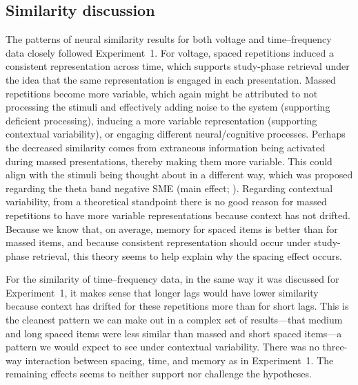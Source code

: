 \subsection{Similarity discussion}

The patterns of neural similarity results for both voltage and time--frequency data closely followed Experiment~1.  For voltage, spaced repetitions induced a consistent representation across time, which supports study-phase retrieval under the idea that the same representation is engaged in each presentation.  Massed repetitions become more variable, which again might be attributed to not processing the stimuli and effectively adding noise to the system (supporting deficient processing), inducing a more variable representation (supporting contextual variability), or engaging different neural/cognitive processes.
Perhaps the decreased similarity comes from extraneous information being activated during massed presentations, thereby making them more variable.  This could align with the stimuli being thought about in a different way, which was proposed regarding the theta band negative SME (main effect; ).
Regarding contextual variability, from a theoretical standpoint there is no good reason for massed repetitions to have more variable representations because context has not drifted.  Because we know that, on average, memory for spaced items is better than for massed items, and because consistent representation should occur under study-phase retrieval, this theory seems to help explain why the spacing effect occurs.

For the similarity of time--frequency data, in the same way it was discussed for Experiment~1, it makes sense that longer lags would have lower similarity because context has drifted for these repetitions more than for short lags.  This is the cleanest pattern we can make out in a complex set of results---that medium and long spaced items were less similar than massed and short spaced items---a pattern we would expect to see under contextual variability.  There was no three-way interaction between spacing, time, and memory as in Experiment~1.  The remaining effects seems to neither support nor challenge the hypotheses.





